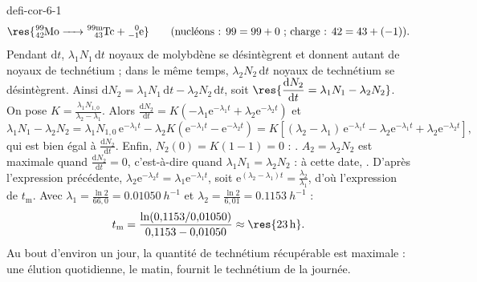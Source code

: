 \begin{blocEdition}{defi-cor-6-1}
\[\res{\ce{^{99}_{42}Mo -> ^{99\text{m}}_{43}Tc + ^{0}_{-1}e}}\qquad\text{(nucléons : }99=99+0\text{ ; charge : }42=43+(-1)\text{)}.\]
Pendant $\mathrm{d}t$, $\lambda_1N_1\,\mathrm{d}t$ noyaux de molybdène se désintègrent et donnent autant de noyaux de
technétium ; dans le même temps, $\lambda_2N_2\,\mathrm{d}t$ noyaux de technétium se désintègrent. Ainsi
$\mathrm{d}N_2=\lambda_1N_1\,\mathrm{d}t-\lambda_2N_2\,\mathrm{d}t$, soit $\res{\dfrac{\mathrm{d}N_2}{\mathrm{d}t}=\lambda_1N_1-\lambda_2N_2}$.
On pose $K=\frac{\lambda_1N_{1,0}}{\lambda_2-\lambda_1}$. Alors
$\frac{\mathrm{d}N_2}{\mathrm{d}t}=K\left(-\lambda_1\mathrm{e}^{-\lambda_1t}+\lambda_2\mathrm{e}^{-\lambda_2t}\right)$ et
\[\lambda_1N_1-\lambda_2N_2=\lambda_1N_{1,0}\,\mathrm{e}^{-\lambda_1t}-\lambda_2K\left(\mathrm{e}^{-\lambda_1t}-\mathrm{e}^{-\lambda_2t}\right)
=K\left[(\lambda_2-\lambda_1)\,\mathrm{e}^{-\lambda_1t}-\lambda_2\mathrm{e}^{-\lambda_1t}+\lambda_2\mathrm{e}^{-\lambda_2t}\right],\]
qui est bien égal à $\frac{\mathrm{d}N_2}{\mathrm{d}t}$. Enfin, $N_2(0)=K(1-1)=0$ : .
$A_2=\lambda_2N_2$ est maximale quand $\frac{\mathrm{d}N_2}{\mathrm{d}t}=0$, c'est-à-dire quand $\lambda_1N_1=\lambda_2N_2$ :
à cette date, . D'après l'expression précédente, $\lambda_2\mathrm{e}^{-\lambda_2t}=\lambda_1\mathrm{e}^{-\lambda_1t}$,
soit $\mathrm{e}^{(\lambda_2-\lambda_1)t}=\frac{\lambda_2}{\lambda_1}$, d'où l'expression de $t_\mathrm{m}$. Avec
$\lambda_1=\frac{\ln2}{66{,}0}=\qty{0,01050}{h^{-1}}$ et $\lambda_2=\frac{\ln2}{6{,}01}=\qty{0,1153}{h^{-1}}$ :
\[t_\mathrm{m}=\frac{\ln(0{,}1153/0{,}01050)}{0{,}1153-0{,}01050}\approx\res{\qty{23}{h}}.\]
Au bout d'environ un jour, la quantité de technétium récupérable est maximale : une élution quotidienne, le matin,
fournit le technétium de la journée.
\end{blocEdition}

